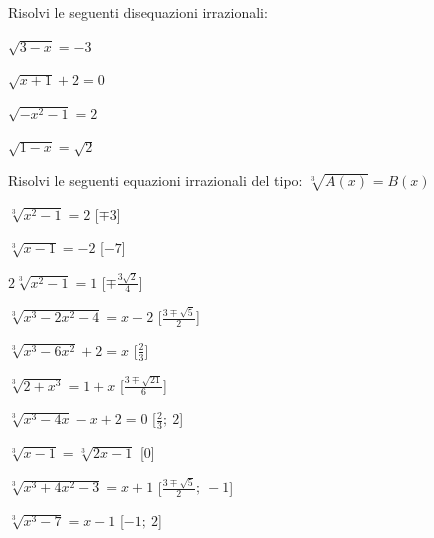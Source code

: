 \begin{esercizio}\label{ese:03.1}
Risolvi le seguenti disequazioni irrazionali:
\begin{multicols}{4}
\begin{enumeratea}
\item \(\sqrt{3 -x} = -3\)
\item \(\sqrt{x +1} +2 = 0 \)
\item \(\sqrt{-x^2 -1} = 2 \)
\item \(\sqrt{1 -x} = \sqrt{2}\)
\end{enumeratea}
\end{multicols}
\end{esercizio}

\begin{esercizio}\label{ese:03.1}
Risolvi le seguenti equazioni irrazionali del tipo:
\(\sqrt[3]{A(x)} = B(x)\)
\begin{multicols}{2}
\begin{enumeratea}
\item \(\sqrt[3]{x^2 -1} = 2\) \hfill [\(\mp 3\)]
\item \(\sqrt[3]{x -1} = -2\) \hfill [\(-7\)]
\item \(2\sqrt[3]{x^2 -1} = 1\) \hfill [\(\mp \frac{3 \sqrt{2}}{4}\)]
\item \(\sqrt[3]{x^3 -2x^2 -4} = x -2\) \hfill [\(\frac{3 \mp \sqrt{5}}{2}\)]
\item \(\sqrt[3]{x^3 -6x^2} +2 = x\) \hfill [\(\frac{2}{3}\)]
\item \(\sqrt[3]{2 +x^3} = 1 +x\) \hfill [\(\frac{3 \mp \sqrt{21}}{6}\)]
\item \(\sqrt[3]{x^3 -4x} -x +2 = 0\) \hfill [\(\frac{2}{3};~2\)]
\item \(\sqrt[3]{x -1} = \sqrt[3]{2x -1}\) \hfill [\(0\)]
\item \(\sqrt[3]{x^3 +4x^2 -3} = x +1\)
  \hfill [\(\frac{3 \mp \sqrt{5}}{2};~-1\)]
\item \(\sqrt[3]{x^3 -7} = x -1\) \hfill [\(-1;~2\)]
\end{enumeratea}
\end{multicols}
\end{esercizio}

